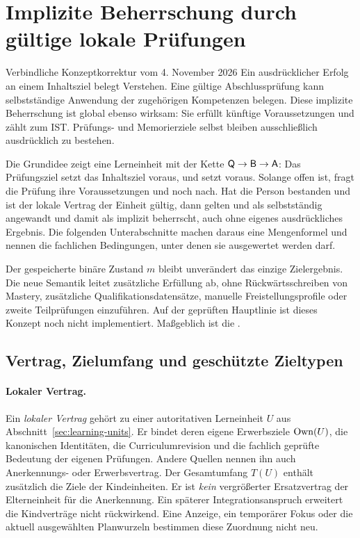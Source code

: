 \section{Implizite Beherrschung durch gültige lokale Prüfungen}
\label{sec:assessment}
\begin{principle}{Verbindliche Konzeptkorrektur vom 4. November 2026}
Ein ausdrücklicher Erfolg an einem Inhaltsziel belegt Verstehen.
Eine gültige Abschlussprüfung kann selbstständige Anwendung der zugehörigen
Kompetenzen belegen. Diese implizite Beherrschung ist global ebenso wirksam:
Sie erfüllt künftige Voraussetzungen und zählt zum IST. Prüfungs- und
Memorierziele selbst bleiben ausschließlich ausdrücklich zu bestehen.
\end{principle}

Die Grundidee zeigt eine Lerneinheit mit der Kette
$\mathsf{Q}\to\mathsf{B}\to\mathsf{A}$: Das Prüfungsziel  setzt das Inhaltsziel
 voraus, und  setzt  voraus. Solange  offen ist,
fragt die Prüfung ihre Voraussetzungen  und  noch nach. Hat die
Person  bestanden und ist der lokale Vertrag der Einheit gültig, dann
gelten  und  als selbstständig angewandt und damit als implizit
beherrscht, auch ohne eigenes ausdrückliches Ergebnis. Die folgenden
Unterabschnitte machen daraus eine Mengenformel und nennen die fachlichen
Bedingungen, unter denen sie ausgewertet werden darf.

Der gespeicherte binäre Zustand $m$ bleibt unverändert das einzige
Zielergebnis. Die neue Semantik leitet zusätzliche Erfüllung ab, ohne
Rückwärtsschreiben von Mastery, zusätzliche Qualifikationsdatensätze,
manuelle Freistellungsprofile oder zweite Teilprüfungen einzuführen.
Auf der geprüften Hauptlinie ist dieses Konzept noch nicht implementiert.
Maßgeblich ist die
.

\subsection{Vertrag, Zielumfang und geschützte Zieltypen}
\paragraph{Lokaler Vertrag.}
Ein \emph{lokaler Vertrag} gehört zu einer autoritativen Lerneinheit $U$ aus
Abschnitt~\ref{sec:learning-units}. Er bindet deren eigene Erwerbsziele
$\operatorname{Own}(U)$, die kanonischen Identitäten, die Curriculumrevision und die
fachlich geprüfte Bedeutung der eigenen Prüfungen. Andere Quellen nennen
ihn auch Anerkennungs- oder Erwerbsvertrag. Der
Gesamtumfang $T(U)$ enthält zusätzlich die Ziele der Kindeinheiten. Er ist
\emph{kein} vergrößerter Ersatzvertrag der Elterneinheit für die
Anerkennung. Ein späterer Integrationsanspruch erweitert die Kindverträge
nicht rückwirkend.
Eine Anzeige, ein temporärer Fokus oder die aktuell ausgewählten Planwurzeln
bestimmen diese Zuordnung nicht neu.

